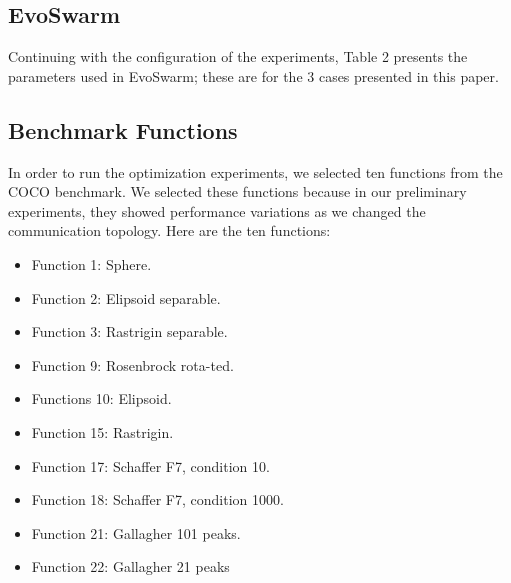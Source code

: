 \documentclass[runningheads]{llncs}
\begin{document}
\subsection{EvoSwarm} 

Continuing with the configuration of the experiments, Table 2 presents the
parameters used in EvoSwarm; these are for the 3 cases presented in this paper.

\begin{table}[h]
\centering
\caption{Parameters for EvoSwarm}
\label{table:1}
\end{table}

\subsection{Benchmark Functions}
In order to run the optimization experiments, we selected ten functions from the COCO benchmark. We selected these functions because in our preliminary experiments, they showed performance variations as we changed the communication topology. Here are the ten functions:
\begin{multicols}{2}
\begin{itemize}

    \item Function 1: Sphere.
    \item Function 2: Elipsoid separable.
    \item Function 3: Rastrigin separable.
    \item Function 9: Rosenbrock rota-ted.
    \item Functions 10: Elipsoid.
    \item Function 15: Rastrigin.
    \item Function 17: Schaffer F7, condition 10.
    \item Function 18: Schaffer F7, condition 1000.
    \item Function 21: Gallagher 101 peaks.
    \item Function 22: Gallagher 21 peaks

\end{itemize}
\end{multicols}
\end{document}
